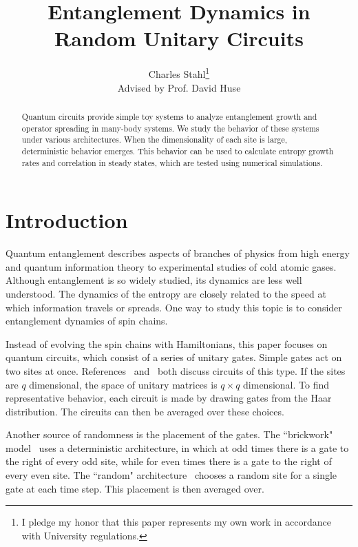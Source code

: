 \documentclass[11pt]{article}
\begin{document}
\title{Entanglement Dynamics in Random Unitary Circuits}
\author{Charles Stahl\footnote{I pledge my honor that this paper represents my own work in accordance with University regulations.}\\
	Advised by Prof. David Huse}

\maketitle

\begin{abstract}
	Quantum circuits provide simple toy systems to analyze entanglement growth and operator spreading in many-body systems. We study the behavior of these systems under various architectures. When the dimensionality of each site is large, deterministic behavior emerges. This behavior can be used to calculate entropy growth rates and correlation in steady states, which are tested using numerical simulations.
\end{abstract}

\tableofcontents

\newpage

\section{Introduction} \label{sec:intro}

Quantum entanglement describes aspects of branches of physics from high energy and quantum information theory to experimental studies of cold atomic gases. Although entanglement is so widely studied, its dynamics are less well understood. The dynamics of the entropy are closely related to the speed at which information travels or spreads. One way to study this topic is to consider entanglement dynamics of spin chains. 

Instead of evolving the spin chains with Hamiltonians, this paper focuses on quantum circuits, which consist of a series of unitary gates. Simple gates act on two sites at once. References~\cite{Keyserlingk} and~\cite{Nahum2017} both discuss circuits of this type. If the sites are $q$ dimensional, the space of unitary matrices is $q\times q$ dimensional. To find representative behavior, each circuit is made by drawing gates from the Haar distribution. The circuits can then be averaged over these choices. 

Another source of randomness is the placement of the gates. The ``brickwork" model~\cite{Keyserlingk} uses a deterministic architecture, in which at odd times there is a gate to the right of every odd site, while for even times there is a gate to the right of every even site. The ``random" architecture~\cite{Nahum2017} chooses a random site for a single gate at each time step. This placement is then averaged over.
\end{document}
